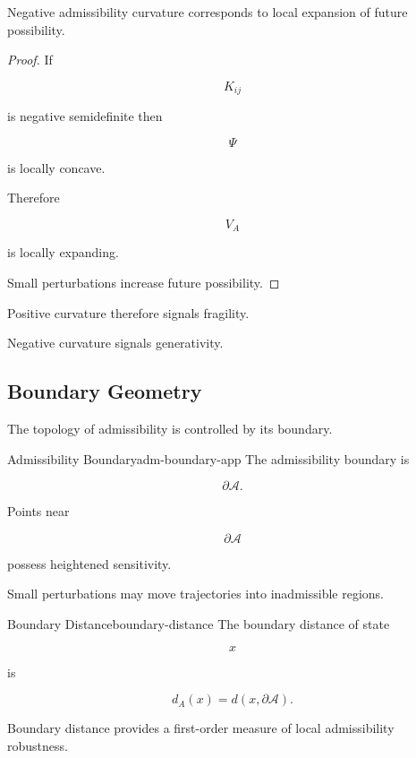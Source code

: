 \documentclass[12pt,twoside,openright]{book}
\newenvironment{prop}
{\begin{proposition}{}{}}
{\end{proposition}}
\begin{document}
\begin{prop}
Negative admissibility curvature corresponds to local
expansion of future possibility.
\end{prop}

\begin{proof}
If

\[
K_{ij}
\]

is negative semidefinite then

\[
\Psi
\]

is locally concave.

Therefore

\[
V_A
\]

is locally expanding.

Small perturbations increase future possibility.
\end{proof}

Positive curvature therefore signals fragility.

Negative curvature signals generativity.

\subsection{Boundary Geometry}

The topology of admissibility is controlled by its
boundary.

\begin{definition}{Admissibility Boundary}{adm-boundary-app}
The admissibility boundary is

\[
\partial\mathcal A.
\]
\end{definition}

Points near

\[
\partial\mathcal A
\]

possess heightened sensitivity.

Small perturbations may move trajectories into
inadmissible regions.

\begin{definition}{Boundary Distance}{boundary-distance}
The boundary distance of state

\[
x
\]

is

\[
d_A(x)
=

d(x,\partial\mathcal A).
\]
\end{definition}

\begin{prop}
Boundary distance provides a first-order measure of local
admissibility robustness.
\end{prop}
\end{document}
